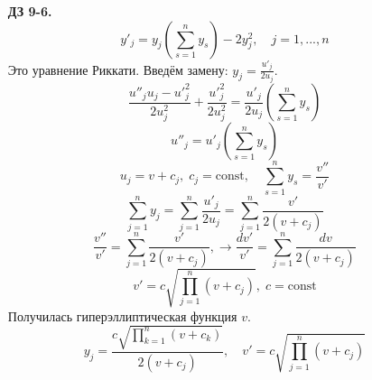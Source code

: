 \documentclass[12pt]{article}
\theoremstyle{definition}
\begin{document}
\begin{itemize}
\begin{proof}
\begin{equation}
{\begin{array}{l}
        0, \quad k=0,...,n-2,\\
        1, \quad k=n-1,\\
        \Gamma, \quad k=n.\\
        \end{array}
        \right.}
    \end{equation}
    \end{proof}
    \item[\textbf{ДЗ 9-6.}]
    \begin{equation}
        y'_j=y_j\left(\sum\limits_{s=1}^ny_s\right)-2y_j^2,\quad j=1,...,n
    \end{equation}
    Это уравнение Риккати. Введём замену: $y_j=\frac{u'_j}{2u_j}$.
    \begin{equation}
        \frac{u''_ju_j-u'_j^2}{2u_j^2}+\frac{u'_j^2}{2u_j^2}=\frac{u'_j}{2u_j}\left(\sum\limits_{s=1}^ny_s\right)
    \end{equation}
    \begin{equation}
        u''_j=u'_j\left(\sum\limits_{s=1}^ny_s\right)
    \end{equation}
    \begin{equation}
        u_j=v+c_j,\; c_j=\text{const}, \quad\sum\limits_{s=1}^ny_s=\frac{v''}{v'}
    \end{equation}
    \begin{equation}
        \sum_{j=1}^ny_j=\sum_{j=1}^n\frac{u'_j}{2u_j}=\sum_{j=1}^n\frac{v'}{2(v+c_j)}
    \end{equation}
    \begin{equation}
        \frac{v''}{v'}=\sum_{j=1}^n\frac{v'}{2(v+c_j)},\rightarrow \frac{dv'}{v'}=\sum_{j=1}^n\frac{dv}{2(v+c_j)}
    \end{equation}
    \begin{equation}
        v'=c\sqrt{\prod\limits_{j=1}^n(v+c_j)},\; c=\text{const}
    \end{equation}
    Получилась гиперэллиптическая функция $v$.
    \begin{equation}
        \boxed{y_j=\frac{c\sqrt{\prod\limits_{k=1}^n(v+c_k)}}{2(v+c_j)},\quad v'=c\sqrt{\prod\limits_{j=1}^n(v+c_j)}}
    \end{equation}
\end{itemize}
\end{document}
